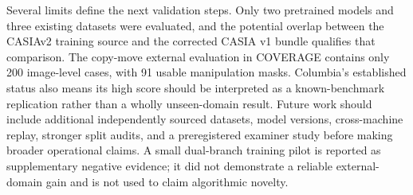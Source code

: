 Several limits define the next validation steps. Only two pretrained models and three existing datasets were evaluated, and the potential overlap between the CASIAv2 training source and the corrected CASIA v1 bundle qualifies that comparison. The copy-move external evaluation in COVERAGE contains only 200 image-level cases, with 91 usable manipulation masks. Columbia's established status also means its high score should be interpreted as a known-benchmark replication rather than a wholly unseen-domain result. Future work should include additional independently sourced datasets, model versions, cross-machine replay, stronger split audits, and a preregistered examiner study before making broader operational claims. A small dual-branch training pilot is reported as supplementary negative evidence; it did not demonstrate a reliable external-domain gain and is not used to claim algorithmic novelty.

